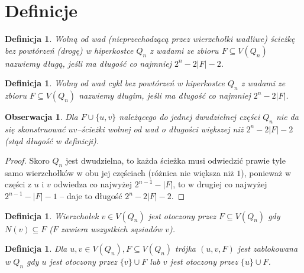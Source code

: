 \documentclass{pracamgr}
\newtheorem{defi}[theorem]{Definicja}
\newtheorem{observation}[theorem]{Obserwacja}
\begin{document}
  \section{Definicje}
   \begin{defi}\label{dluga sciezka}
    Wolną od wad (nieprzechodzącą przez wierzchołki wadliwe)
    ścieżkę bez powtórzeń (drogę) w hiperkostce $Q_n$ z wadami ze zbioru $F\subseteq V(Q_n)$ nazwiemy długą, jeśli ma długość co najmniej $2^n-2|F|-2$.
   \end{defi}
   \begin{defi}\label{dlugi cykl}
    Wolny od wad cykl bez powtórzeń w hiperkostce $Q_n$ z wadami ze zbioru $F\subseteq V(Q_n)$ nazwiemy długim, jeśli ma długość co najmniej $2^n-2|F|$.
   \end{defi}
   \begin{observation}\label{dluga sciezka- nie da sie dluzszej}
    Dla $F\cup\{u,v\}$ należącego do jednej dwudzielnej części $Q_n$ nie da się skonstruować $uv$--ścieżki wolnej od wad o długości większej niż $2^n-2|F|-2$
    (stąd długość w definicji).
   \end{observation}
   \begin{proof}
    Skoro $Q_n$ jest dwudzielna, to każda ścieżka musi odwiedzić prawie tyle samo wierzchołków w obu jej częściach (różnica nie większa niż $1$),
    ponieważ w części z $u$ i $v$ odwiedza co najwyżej $2^{n-1}-|F|$, to w drugiej co najwyżej $2^{n-1}-|F|-1$ -- daje to długość $2^n-2|F|-2$.
   \end{proof}
   \begin{defi}\label{wierzcholek otoczony}
    Wierzchołek $v\in V(Q_n)$ jest \emph{otoczony} przez $F\subseteq V(Q_n)$ gdy $N(v)\subseteq F$ ($F$ zawiera wszystkich sąsiadów $v$).
   \end{defi}
   \begin{defi}\label{para zablokowana}
    Dla $u,v\in V(Q_n), F\subseteq V(Q_n)$
    trójka $(u,v,F)$ jest \emph{zablokowana w $Q_n$} gdy $u$ jest otoczony przez $\{v\}\cup F$ lub $v$ jest otoczony przez $\{u\}\cup F$.
   \end{defi}
\end{document}
